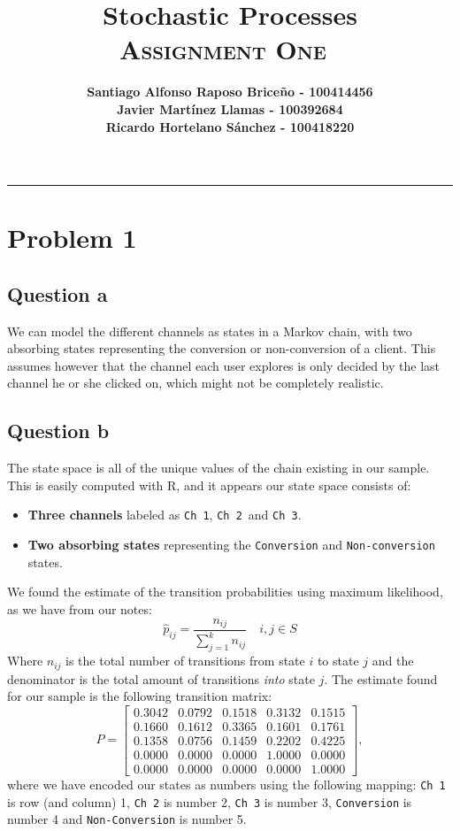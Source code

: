 \documentclass[11pt, a4paper]{article}
\title{\vspace{-8ex} \huge \bfseries Stochastic Processes\\
	\LARGE \normalfont \textsc{Assignment One} \vspace{-2ex}}
\author{\bfseries Santiago Alfonso Raposo Briceño - 100414456 \\
		\bfseries Javier Martínez Llamas - 100392684\\
		\bfseries Ricardo Hortelano Sánchez - 100418220}
\date{\vspace{-5ex}} %
\begin{document}
\maketitle
\hrule

\section{Problem 1}

\subsection{Question a}
We can model the different channels as states in a Markov chain, with two absorbing states representing the conversion or non-conversion of a client.
This assumes however that the channel each user explores is only decided by the last channel he or she clicked on, which might not be completely realistic.

\subsection{Question b}
The state space is all of the unique values of the chain existing in our sample. This is easily computed with R, and it appears our state space consists of:
\begin{itemize}
	\item \textbf{Three channels} labeled as \verb|Ch 1|, \verb|Ch 2| and \verb|Ch 3|.
	\item \textbf{Two absorbing states} representing the \verb|Conversion| and \verb|Non-conversion| states.
\end{itemize}

We found the estimate of the transition probabilities using maximum likelihood, as we have from our notes:
\[
	\hat p_{ij} = \frac{n_{ij}}{\sum_{j = 1}^{k}n_{ij}} \quad i,j \in S
\]
Where $n_{ij}$ is the total number of transitions from state $i$ to state $j$ and the denominator is the total amount of transitions \emph{into} state $j$.
The estimate found for our sample is the following transition matrix:
\[
 P = \begin{bmatrix}
 	0.3042 & 0.0792 & 0.1518 & 0.3132 & 0.1515 \\
 	0.1660 & 0.1612 & 0.3365 & 0.1601 & 0.1761 \\
 	0.1358 & 0.0756 & 0.1459 & 0.2202 & 0.4225 \\
 	0.0000 & 0.0000 & 0.0000 & 1.0000 & 0.0000 \\
 	0.0000 & 0.0000 & 0.0000 & 0.0000 & 1.0000
 \end{bmatrix},
\]
where we have encoded our states as numbers using the following mapping: \verb|Ch 1| is row (and column) 1, \verb|Ch 2| is number 2, \verb|Ch 3| is number 3, \verb|Conversion| is number 4 and \verb|Non-Conversion| is number 5.
\end{document}
